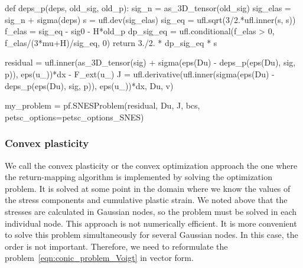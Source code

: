\documentclass[12pt]{article}
\begin{document}
\begin{pythoncode}
    def deps_p(deps, old_sig, old_p):
        sig_n = as_3D_tensor(old_sig)
        sig_elas = sig_n + sigma(deps)
        s = ufl.dev(sig_elas)
        sig_eq = ufl.sqrt(3/2.*ufl.inner(s, s))
        f_elas = sig_eq - sig0 - H*old_p
        dp_sig_eq = ufl.conditional(f_elas > 0, f_elas/(3*mu+H)/sig_eq, 0) 
        return 3./2. * dp_sig_eq * s 
\end{pythoncode}

\begin{pythoncode}
    residual = ufl.inner(as_3D_tensor(sig) + sigma(eps(Du) - deps_p(eps(Du), sig, p)), eps(u_))*dx - F_ext(u_)
    J = ufl.derivative(ufl.inner(sigma(eps(Du) - deps_p(eps(Du), sig, p)), eps(u_))*dx, Du, v)

    my_problem = pf.SNESProblem(residual, Du, J, bcs, petsc_options=petsc_options_SNES)
\end{pythoncode}
\subsubsection{Convex plasticity}
We call the convex plasticity or the convex optimization approach the one where the return-mapping algorithm is implemented by solving the optimization problem. It is solved at some point in the domain where we know the values of the stress components and cumulative plastic strain. We noted above that the stresses are calculated in Gaussian nodes, so the problem must be solved in each individual node. This approach is not numerically efficient. It is more convenient to solve this problem simultaneously for several Gaussian nodes. In this case, the order is not important. Therefore, we need to reformulate the problem~\ref{eqn:conic_problem_Voigt} in vector form. 
\end{document}

